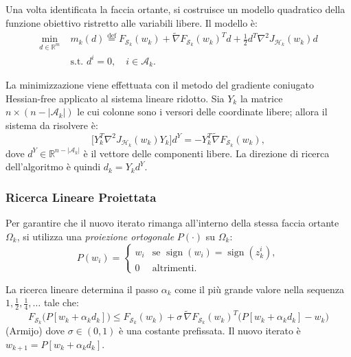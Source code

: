 \documentclass[a4paper,12pt]{article}
\numberwithin{equation}{section}
\numberwithin{figure}{section}
\numberwithin{table}{section}
\begin{document}
Una volta identificata la faccia ortante, si costruisce un modello quadratico
della funzione obiettivo ristretto alle variabili libere. Il modello è:
\begin{equation}
\begin{aligned}
\min_{d \in \mathbb{R}^m} \;& m_k(d) \stackrel{\mathrm{def}}{=}
F_{\mathcal{S}_k}(w_k) + \widetilde{\nabla}F_{\mathcal{S}_k}(w_k)^T d
+ \frac{1}{2} d^T \nabla^2 J_{\mathcal{H}_k}(w_k) d \\
& \text{s.t. } d^i = 0, \quad i \in \mathcal{A}_k.
\end{aligned} \tag{5.47}
\end{equation}

La minimizzazione viene effettuata con il metodo del gradiente coniugato
Hessian-free applicato al sistema lineare ridotto. Sia $Y_k$ la matrice
$n \times (n - |\mathcal{A}_k|)$ le cui colonne sono i versori delle coordinate
libere; allora il sistema da risolvere è:
\begin{equation}
\bigl[ Y_k^T \nabla^2 J_{\mathcal{H}_k}(w_k) Y_k \bigr] d^Y
= -Y_k^T \widetilde{\nabla}F_{\mathcal{S}_k}(w_k), \tag{5.48}
\end{equation}
dove $d^Y \in \mathbb{R}^{n-|\mathcal{A}_k|}$ è il vettore delle componenti libere.
La direzione di ricerca dell'algoritmo è quindi $d_k = Y_k d^Y$.

\subsubsection{Ricerca Lineare Proiettata}

Per garantire che il nuovo iterato rimanga all'interno della stessa faccia
ortante $\Omega_k$, si utilizza una \emph{proiezione ortogonale} $P(\cdot)$
su $\Omega_k$:
\begin{equation}
P(w_i) =
\begin{cases}
w_i & \text{se } \operatorname{sign}(w_i) = \operatorname{sign}(z_k^i), \\[4pt]
0   & \text{altrimenti}.
\end{cases} \tag{5.49}
\end{equation}

La ricerca lineare determina il passo $\alpha_k$ come il più grande valore
nella sequenza $1, \frac{1}{2}, \frac{1}{4}, \dots$ tale che:
\begin{equation}
F_{\mathcal{S}_k}\bigl(P[w_k + \alpha_k d_k]\bigr)
\le F_{\mathcal{S}_k}(w_k)
+ \sigma \, \widetilde{\nabla}F_{\mathcal{S}_k}(w_k)^T
\bigl(P[w_k + \alpha_k d_k] - w_k\bigr)\tag{5.50}
\end{equation}
(Armijo)
dove $\sigma \in (0,1)$ è una costante prefissata. Il nuovo iterato è
$w_{k+1} = P[w_k + \alpha_k d_k]$.
\end{document}
